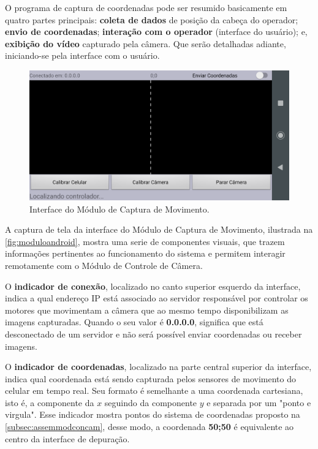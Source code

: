 O programa de captura de coordenadas pode ser resumido basicamente em quatro partes principais: \textbf{coleta de dados} de posição da cabeça do operador; \textbf{envio de coordenadas}; \textbf{interação com o operador} (interface do usuário); e, \textbf{exibição do vídeo} capturado pela câmera. Que serão detalhadas adiante, iniciando-se pela  interface com o usuário.\par


\begin{figure}[H]
	\centering
	\includegraphics[width=1\textwidth]{figuras/modulo_android_1.png}
	\caption{Interface do Módulo de Captura de Movimento.}
	\label{fig:moduloandroid}
\end{figure}

A captura de tela da interface do Módulo de Captura de Movimento, ilustrada na \autoref{fig:moduloandroid}, mostra uma serie de componentes visuais, que trazem informações pertinentes ao funcionamento do sistema e permitem interagir remotamente com o Módulo de Controle de Câmera. \par

O \textbf{indicador de conexão}, localizado no canto superior esquerdo da interface, indica a qual endereço IP está associado ao servidor responsável por controlar os motores que movimentam a câmera que ao mesmo tempo disponibilizam as imagens capturadas. Quando o seu valor é \textbf{0.0.0.0}, significa que está desconectado de um servidor e não será possível enviar coordenadas ou receber imagens.\par

O \textbf{indicador de coordenadas}, localizado na parte central superior da interface, indica qual coordenada está sendo capturada pelos sensores de movimento do celular em tempo real. Seu formato é semelhante a uma coordenada cartesiana, isto é, a componente da $x$ seguindo da componente $y$ e separada por um "ponto e virgula". Esse indicador mostra pontos do sistema de coordenadas proposto na \autoref{subsec:assemmodconcam}, desse modo, a coordenada \textbf{50;50} é equivalente ao centro da interface de depuração.\par

